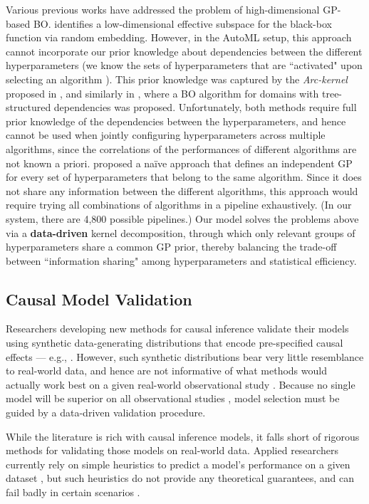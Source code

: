 \documentclass [PhD] {uclathes}
\begin{document}
Various previous works have addressed the problem of high-dimensional GP-based BO. \cite{wang2013bayesian} identifies a low-dimensional effective subspace for the black-box function via random embedding. However, in the AutoML setup, this approach cannot incorporate our prior knowledge about dependencies between the different hyperparameters (we know the sets of hyperparameters that are ``activated" upon selecting an algorithm \cite{hutter2011sequential}). This prior knowledge was captured by the {\it Arc-kernel} proposed in \cite{swersky2014raiders}, and similarly in \cite{jenatton2017bayesian}, where a BO algorithm for domains with tree-structured dependencies was proposed. Unfortunately, both methods require full prior knowledge of the dependencies between the hyperparameters, and hence cannot be used when jointly configuring hyperparameters across multiple algorithms, since the correlations of the performances of different algorithms are not known a priori. \cite{bergstra2011implementations} proposed a na\"ive approach that defines an independent GP for every set of hyperparameters that belong to the same algorithm. Since it does not share any information between the different algorithms, this approach would require trying all combinations of algorithms in a pipeline exhaustively. (In our system, there are 4,800 possible pipelines.) Our model solves the problems above via a {\bf data-driven} kernel decomposition, through which only relevant groups of hyperparameters share a common GP prior, thereby balancing the trade-off between ``information sharing" among hyperparameters and statistical efficiency. 

\subsection{Causal Model Validation}
Researchers developing new methods for causal inference validate their models using synthetic data-generating distributions that encode pre-specified causal effects --- e.g., \cite{hill2011bayesian,wager2017estimation,powers2017some}. However, such synthetic distributions bear very little resemblance to real-world data, and hence are not informative of what methods would actually work best on a given real-world observational study \cite{setoguchi2008evaluating}. Because no single model will be superior on all observational studies \cite{dorie2017automated}, model selection must be guided by a data-driven validation procedure.

While the literature is rich with causal inference models, it falls short of rigorous methods for validating those models on real-world data. Applied researchers currently rely on simple heuristics to predict a model's performance on a given dataset \cite{schuler2017synth,rolling2014model,van2003unified}, but such heuristics do not provide any theoretical guarantees, and can fail badly in certain scenarios \cite{schuler2018general}.
\end{document}
